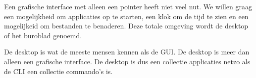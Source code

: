 Een grafische interface met alleen een pointer heeft niet veel nut. We willen graag een mogelijkheid om applicaties op te starten, een klok om de tijd te zien en een mogelijkeid om bestanden te benaderen. Deze totale omgeving wordt de desktop of het buroblad genoemd.

De desktop is wat de meeste mensen kennen als de GUI. De desktop is meer dan alleen een grafische interface. De desktop is dus een collectie applicaties netzo als de CLI een collectie commando's is.

